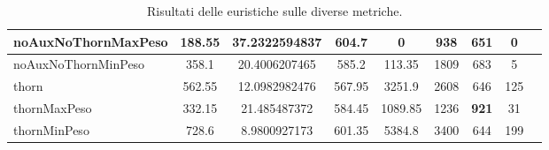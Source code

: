 \begin{table}
\begin{tabular}{l|c|c|c|c|c|c|c|c}
noAuxNoThornMaxPeso & \textbf{188.55}      & \textbf{37.2322594837}                                           & \textbf{604.7}                                                              & \textbf{0}                                                                 & \textbf{938}                                                       & 651                                                                     & \textbf{0}                                                             \\ \hline
\rowcolor[HTML]{EFEFEF} 
noAuxNoThornMinPeso & 358.1                & 20.4006207465                                                    & 585.2                                                                       & 113.35                                                                     & 1809                                                                 & 683                                                                     & 5                                                                      \\ \hline
thorn               & 562.55               & 12.0982982476                                                    & 567.95                                                                      & 3251.9                                                                     & 2608                                                                  & 646                                                                     & 125                                                                    \\ \hline
\rowcolor[HTML]{EFEFEF} 
thornMaxPeso        & 332.15               & 21.485487372                                                     & 584.45                                                                      & 1089.85                                                                    & 1236                                                                 & \textbf{921}                                                            & 31                                                                     \\ \hline
thornMinPeso        & 728.6                & 8.9800927173                                                     & 601.35                                                                      & 5384.8                                                                     & 3400                                                                 & 644                                                                     & 199                                                                   
\end{tabular}
\caption{Risultati delle euristiche sulle diverse metriche.}
\label{tab:results}
\end{table}


